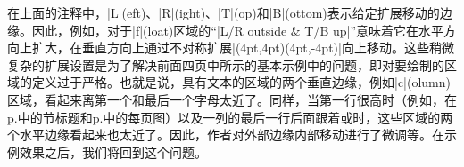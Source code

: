 在上面的注释中，|L|(eft)、|R|(ight)、|T|(op)和|B|(ottom)表示给定扩展移动的边缘。因此，例如，对于|f|(loat)区域的``|L/R outside & T/B up|''意味着它在水平方向上扩大，在垂直方向上通过不对称扩展|(4pt,4pt)(4pt,-4pt)|向上移动。这些稍微复杂的扩展设置是为了解决前面四页中所示的基本示例中的问题，即对要绘制的区域的定义过于严格。也就是说，具有文本的区域的两个垂直边缘，例如|c|(olumn)区域，看起来离第一个和最后一个字母太近了。同样，当第一行很高时（例如，在p.\Tie\pageref{sec:bgpaint}中的节标题和p.\Tie\pageref{page:bgpaint2}中的每页图）以及一列的最后一行后面跟着\mctext{}或\postenv 时，这些区域的两个水平边缘看起来也太近了。因此，作者对外部边缘内部移动进行了微调等。在示例效果之后，我们将回到这个问题。
% 
% 
% 
% 
